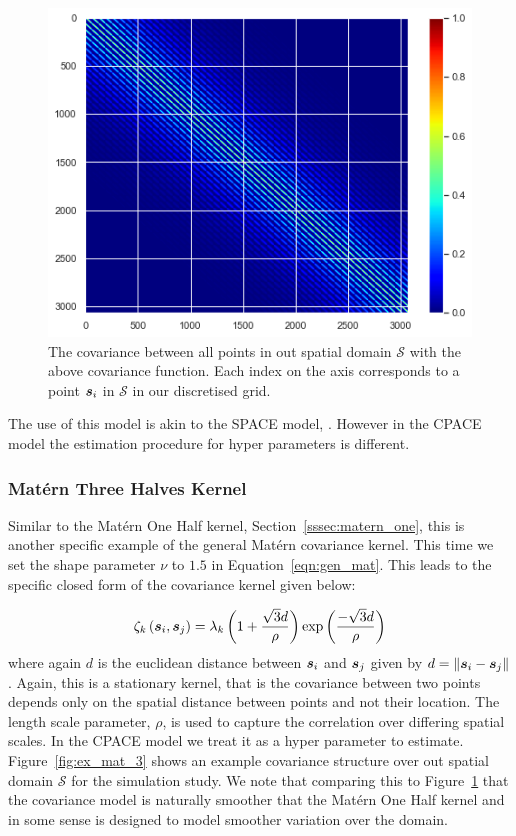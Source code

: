 \begin{figure}
	\centering
	\includegraphics[width=\textwidth]{ex_mat_1}
	\caption{The covariance between all points in out spatial domain $\mathcal{S}$ with the above covariance function. Each index on the axis corresponds to a point $\bm{{s}}_i$ in $\mathcal{S}$ in our discretised grid.}
	\label{fig:ex_mat_1}
\end{figure}

The use of this model is akin to the SPACE model, \citep{liu_functional_2017}.
However in the CPACE model the estimation procedure for hyper parameters is different.

\subsubsection{Mat\'ern Three Halves Kernel \label{sssec:matern_three}}
Similar to the Mat\'ern One Half kernel, Section~\ref{sssec:matern_one}, this is another specific example of the general Mat\'ern covariance kernel.
This time we set the shape parameter $\nu$ to $1.5$ in Equation~\ref{eqn:gen_mat}.
This leads to the specific closed form of the covariance kernel given below:

\begin{equation}
	\zeta_k \left(\bm{{s}}_{i}, \bm{{s}}_{j}\right) = \lambda_k \left(1 + \frac{\sqrt{3}d}{\rho} \right)\exp \left(\frac{- \sqrt{3}d}{\rho} \right)
\end{equation}
where again $d$ is the euclidean distance between $\bm{{s}}_{i}$ and $\bm{{s}}_{j}$ given by $d = \lVert \bm{{s}}_{i} - \bm{{s}}_{j} \rVert$. 
Again, this is a stationary kernel, that is the covariance between two points depends only on the spatial distance between points and not their location.
The length scale parameter, $\rho$, is used to capture the correlation over differing spatial scales.
In the CPACE model we treat it as a hyper parameter to estimate.
Figure~\ref{fig:ex_mat_3} shows an example covariance structure over out spatial domain $\mathcal{S}$ for the simulation study.
We note that comparing this to Figure~\ref{fig:ex_mat_1} that the covariance model is naturally smoother that the Mat\'ern One Half kernel and in some sense is designed to model smoother variation over the domain.

